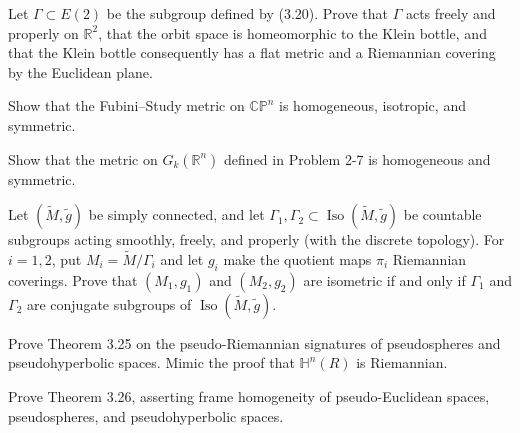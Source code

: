 \begin{exercise}
\label{prob:klein-bottle-flat-covering}
Let $\Gamma\subset E(2)$ be the subgroup defined by (3.20). Prove that $\Gamma$
acts freely and properly on $\mathbb R^2$, that the orbit space is homeomorphic
to the Klein bottle, and that the Klein bottle consequently has a flat metric and
a Riemannian covering by the Euclidean plane.
\end{exercise}

\begin{exercise}
\label{prob:fubini-study-metric-homogeneous}
Show that the Fubini--Study metric on $\mathbb{CP}^n$ is homogeneous, isotropic,
and symmetric.
\end{exercise}

\begin{exercise}
\label{prob:grassmannian-metric-homogeneous}
Show that the metric on $G_k(\mathbb R^n)$ defined in Problem 2-7 is homogeneous
and symmetric.
\end{exercise}

\begin{exercise}
\label{prob:riemannian-quotients-conjugate-subgroups}
Let $(\widetilde M,\widetilde g)$ be simply connected, and let
$\Gamma_1,\Gamma_2\subset\operatorname{Iso}(\widetilde M,\widetilde g)$ be
countable subgroups acting smoothly, freely, and properly (with the discrete
topology). For $i=1,2$, put $M_i=\widetilde M/\Gamma_i$ and let $g_i$ make the
quotient maps $\pi_i$ Riemannian coverings. Prove that $(M_1,g_1)$ and
$(M_2,g_2)$ are isometric if and only if $\Gamma_1$ and $\Gamma_2$ are conjugate
subgroups of $\operatorname{Iso}(\widetilde M,\widetilde g)$.
\end{exercise}

\begin{exercise}
\label{prob:pseudospheres-pseudo-riemannian}
Prove Theorem 3.25 on the pseudo-Riemannian signatures of pseudospheres and
pseudohyperbolic spaces. Mimic the proof that $\mathbb H^n(R)$ is Riemannian.
\end{exercise}

\begin{exercise}
\label{prob:frame-homogeneity-pseudo-spaces}
Prove Theorem 3.26, asserting frame homogeneity of pseudo-Euclidean spaces,
pseudospheres, and pseudohyperbolic spaces.
\end{exercise}

